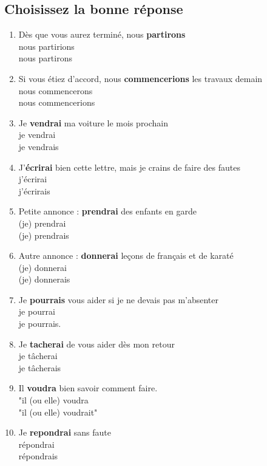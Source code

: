 \documentclass[12pt]{article}
\newcommand{\colo}[1]{{\color{blue}\textbf{#1}}}
\begin{document}
\subsection{Choisissez la bonne réponse}
\begin{enumerate}
		\item Dès que vous aurez terminé, nous \colo{partirons}\\ 
	       nous partirions \\ 
	       nous partirons 
	      \item Si vous étiez d'accord, nous \colo{commencerions} les travaux demain \\  nous commencerons \\ 
	       nous commencerions 
	      \item Je \colo{vendrai} ma voiture le mois prochain \\ 
	       je vendrai \\ 
	       je vendrais 
	      \item J'\colo{écrirai} bien cette lettre, mais je crains de faire des fautes \\  j'écrirai \\ 
	       j'écrirais 
	      \item Petite annonce : \colo{prendrai} des enfants en garde \\ 
	       (je) prendrai \\ 
	       (je) prendrais 
	      \item Autre annonce : \colo{donnerai} leçons de français et de karaté \\  (je) donnerai \\ 
	       (je) donnerais 
	      \item Je \colo{pourrais} vous aider si je ne devais pas m'absenter \\  je pourrai \\ 
	       je pourrais.
	      \item Je \colo{tacherai} de vous aider dès mon retour \\ 
	       je tâcherai \\  je tâcherais 
	      \item Il \colo{voudra} bien savoir comment faire. \\ 
	       "il (ou elle) voudra \\ 
	       "il (ou elle) voudrait" 
	      \item Je \colo{repondrai} sans faute \\ 
	       répondrai \\ 
	       répondrais
\end{enumerate}
\end{document}
